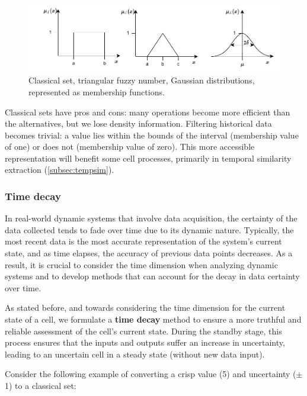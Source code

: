 \begin{figure}[h!]
    \centering
    \includegraphics[width=15cm]{figures/chapter4/cell/classic_fuzzy_gaussian.pdf}
    \caption{Classical set, triangular fuzzy number, Gaussian distributions, represented as membership functions.}
    \label{fig:classicfuzzygaussian}
\end{figure}

Classical sets have pros and cons: many operations become more efficient than the alternatives, but we lose density information. Filtering historical data becomes trivial: a value lies within the bounds of the interval (membership value of one) or does not (membership value of zero). This more accessible representation will benefit some cell processes, primarily in temporal similarity extraction (\ref{subsec:tempsim}).

\subsubsection{Time decay} \label{subsec:timedecay}

In real-world dynamic systems that involve data acquisition, the certainty of the data collected tends to fade over time due to its dynamic nature. Typically, the most recent data is the most accurate representation of the system's current state, and as time elapses, the accuracy of previous data points decreases. As a result, it is crucial to consider the time dimension when analyzing dynamic systems and to develop methods that can account for the decay in data certainty over time.

As stated before, and towards considering the time dimension for the current state of a cell, we formulate a \textbf{time decay} method to ensure a more truthful and reliable assessment of the cell's current state. During the standby stage, this process ensures that the inputs and outputs suffer an increase in uncertainty, leading to an uncertain cell in a steady state (without new data input).

Consider the following example of converting a crisp value (5) and uncertainty ($\pm$1) to a classical set:

